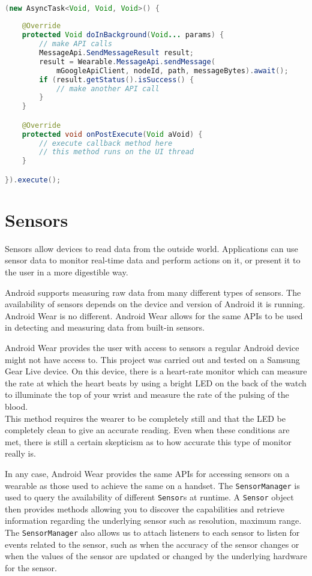 \begin{lstlisting}[language=Java]

(new AsyncTask<Void, Void, Void>() {
    
    @Override
    protected Void doInBackground(Void... params) {
        // make API calls
        MessageApi.SendMessageResult result;
        result = Wearable.MessageApi.sendMessage(
            mGoogleApiClient, nodeId, path, messageBytes).await();
        if (result.getStatus().isSuccess() {
            // make another API call
        }
    }

    @Override
    protected void onPostExecute(Void aVoid) {
        // execute callback method here
        // this method runs on the UI thread
    }

}).execute();

\end{lstlisting}



\section{Sensors}

Sensors allow devices to read data from the outside world. Applications can use
sensor data to monitor real-time data and perform actions on it, or present it
to the user in a more digestible way.

Android supports measuring raw data from many different types of sensors. The
availability of sensors depends on the device and version of Android it is
running. Android Wear is no different. Android Wear allows for the same APIs
to be used in detecting and measuring data from built-in sensors.

Android Wear provides the user with access to sensors a regular Android device
might not have access to. This project was carried out and tested on a
Samsung Gear Live device. On this device, there is a heart-rate monitor which
can measure the rate at which the heart beats by using a bright LED on the back
of the watch to illuminate the top of your wrist and measure the rate of the
pulsing of the blood.\\
This method requires the wearer to be completely still and that the LED be
completely clean to give an accurate reading. Even when these conditions are
met, there is still a certain skepticism as to how accurate this type of
monitor really is.

In any case, Android Wear provides the same APIs for accessing sensors on a
wearable as those used to achieve the same on a handset. The
\texttt{SensorManager} is used to query the availability of different
\texttt{Sensor}s at runtime. A \texttt{Sensor} object then provides methods
allowing you to discover the capabilities and retrieve information regarding
the underlying sensor such as resolution, maximum range.\\
The \texttt{SensorManager} also allows us to attach listeners to each sensor
to listen for events related to the sensor, such as when the accuracy of the
sensor changes or when the values of the sensor are updated or changed by the
underlying hardware for the sensor.

